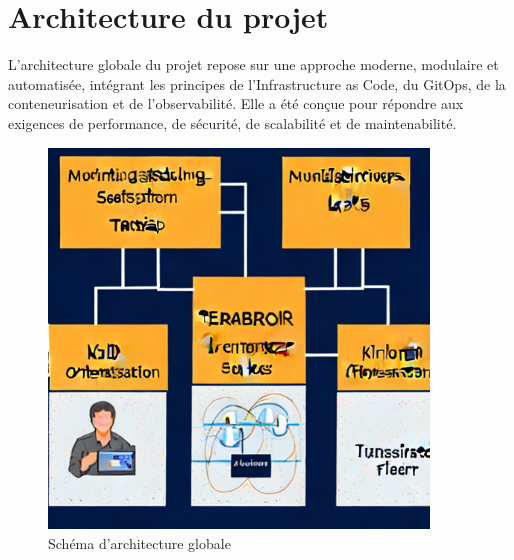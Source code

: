 
\section{Architecture du projet}

L'architecture globale du projet repose sur une approche moderne, modulaire et automatisée, intégrant les principes de l'Infrastructure as Code, du GitOps, de la conteneurisation et de l'observabilité. Elle a été conçue pour répondre aux exigences de performance, de sécurité, de scalabilité et de maintenabilité.

\begin{figure}[H]
	\centering
	\includegraphics[width=0.9\textwidth]{figures/architecture-globale.png}
	\caption{Schéma d'architecture globale}
\end{figure}

